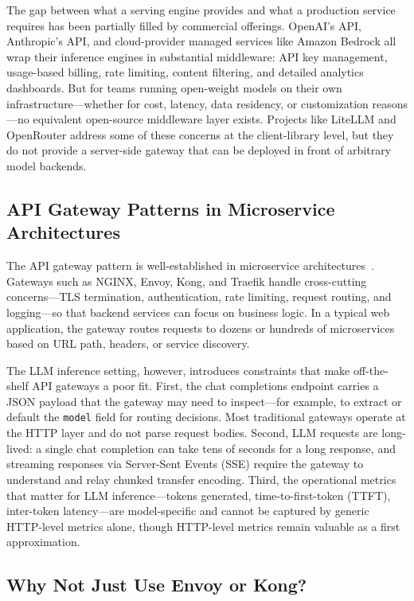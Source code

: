 \documentclass[10pt,journal]{IEEEtran}
\begin{document}
The gap between what a serving engine provides and what a production service requires has been partially filled by commercial offerings. OpenAI's API, Anthropic's API, and cloud-provider managed services like Amazon Bedrock all wrap their inference engines in substantial middleware: API key management, usage-based billing, rate limiting, content filtering, and detailed analytics dashboards. But for teams running open-weight models on their own infrastructure---whether for cost, latency, data residency, or customization reasons---no equivalent open-source middleware layer exists. Projects like LiteLLM and OpenRouter address some of these concerns at the client-library level, but they do not provide a server-side gateway that can be deployed in front of arbitrary model backends.

\subsection{API Gateway Patterns in Microservice Architectures}

The API gateway pattern is well-established in microservice architectures~\cite{newman2015building}. Gateways such as NGINX, Envoy, Kong, and Traefik handle cross-cutting concerns---TLS termination, authentication, rate limiting, request routing, and logging---so that backend services can focus on business logic. In a typical web application, the gateway routes requests to dozens or hundreds of microservices based on URL path, headers, or service discovery.

The LLM inference setting, however, introduces constraints that make off-the-shelf API gateways a poor fit. First, the chat completions endpoint carries a JSON payload that the gateway may need to inspect---for example, to extract or default the \texttt{model} field for routing decisions. Most traditional gateways operate at the HTTP layer and do not parse request bodies. Second, LLM requests are long-lived: a single chat completion can take tens of seconds for a long response, and streaming responses via Server-Sent Events (SSE) require the gateway to understand and relay chunked transfer encoding. Third, the operational metrics that matter for LLM inference---tokens generated, time-to-first-token (TTFT), inter-token latency---are model-specific and cannot be captured by generic HTTP-level metrics alone, though HTTP-level metrics remain valuable as a first approximation.

\subsection{Why Not Just Use Envoy or Kong?}
\end{document}
